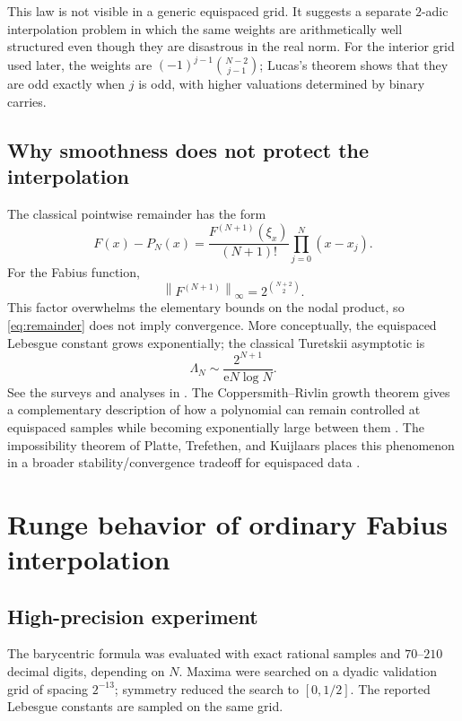 \documentclass[11pt,oneside]{article}
\theoremstyle{definition}
\theoremstyle{remark}
\newcommand{\Leb}{\Lambda}
\newcommand{\e}{\mathrm e}
\newcommand{\norm}[1]{\left\lVert #1\right\rVert}
\begin{document}
This law is not visible in a generic equispaced grid.  It suggests a separate $2$-adic interpolation problem in which the same weights are arithmetically well structured even though they are disastrous in the real norm.  For the interior grid used later, the weights are $(-1)^{j-1}\binom{N-2}{j-1}$; Lucas's theorem shows that they are odd exactly when $j$ is odd, with higher valuations determined by binary carries.

\subsection{Why smoothness does not protect the interpolation}

The classical pointwise remainder has the form
\begin{equation}
 F(x)-P_N(x)=\frac{F^{(N+1)}(\xi_x)}{(N+1)!}
 \prod_{j=0}^{N}(x-x_j).
 \label{eq:remainder}
\end{equation}
For the Fabius function,
\begin{equation}
 \norm{F^{(N+1)}}_\infty=2^{\binom{N+2}{2}}.
\end{equation}
This factor overwhelms the elementary bounds on the nodal product, so \eqref{eq:remainder} does not imply convergence.  More conceptually, the equispaced Lebesgue constant grows exponentially; the classical Turetskii asymptotic is
\begin{equation}
 \Leb_N\sim \frac{2^{N+1}}{\e N\log N}.
 \label{eq:turetskii}
\end{equation}
See the surveys and analyses in \cite{brutman,smith-lebesgue,mills}.  The Coppersmith--Rivlin growth theorem gives a complementary description of how a polynomial can remain controlled at equispaced samples while becoming exponentially large between them \cite{coppersmith-rivlin}.  The impossibility theorem of Platte, Trefethen, and Kuijlaars places this phenomenon in a broader stability/convergence tradeoff for equispaced data \cite{platte-trefethen-kuijlaars}.

\section{Runge behavior of ordinary Fabius interpolation}
\label{sec:ordinary-runge}

\subsection{High-precision experiment}

The barycentric formula was evaluated with exact rational samples and $70$--$210$ decimal digits, depending on $N$.  Maxima were searched on a dyadic validation grid of spacing $2^{-13}$; symmetry reduced the search to $[0,1/2]$.  The reported Lebesgue constants are sampled on the same grid.
\end{document}
